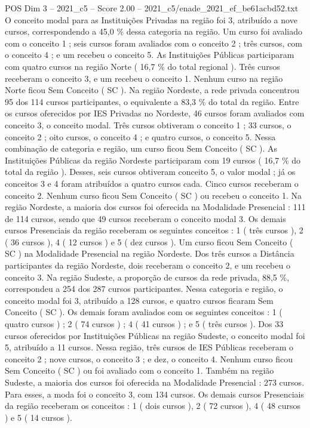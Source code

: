 \begin{textsample}{POS Dim 3 – 2021\_c5 – Score 2.00 – 2021\_c5/enade\_2021\_ef\_be61acbd52.txt}
O conceito modal para as Instituições Privadas na região foi 3, atribuído a nove cursos, correspondendo a 45,0 \% dessa categoria na região.
Um curso foi avaliado com o conceito 1 ; seis cursos foram avaliados com o conceito 2 ; três cursos, com o conceito 4 ; e um recebeu o conceito 5.
As Instituições Públicas participaram com quatro cursos na região Norte ( 16,7 \% do total regional ).
Três cursos receberam o conceito 3, e um recebeu o conceito 1.
Nenhum curso na região Norte ficou Sem Conceito ( SC ).
Na região Nordeste, a rede privada concentrou 95 dos 114 cursos participantes, o equivalente a 83,3 \% do total da região.
Entre os cursos oferecidos por IES Privadas no Nordeste, 46 cursos foram avaliados com conceito 3, o conceito modal.
Três cursos obtiveram o conceito 1 ; 33 cursos, o conceito 2 ; oito cursos, o conceito 4 ; e quatro cursos, o conceito 5.
Nessa combinação de categoria e região, um curso ficou Sem Conceito ( SC ).
As Instituições Públicas da região Nordeste participaram com 19 cursos ( 16,7 \% do total da região ).
Desses, seis cursos obtiveram conceito 5, o valor modal ; já os conceitos 3 e 4 foram atribuídos a quatro cursos cada.
Cinco cursos receberam o conceito 2.
Nenhum curso ficou Sem Conceito ( SC ) ou recebeu o conceito 1.
Na região Nordeste, a maioria dos cursos foi oferecida na Modalidade Presencial : 111 de 114 cursos, sendo que 49 cursos receberam o conceito modal 3.
Os demais cursos Presenciais da região receberam os seguintes conceitos : 1 ( três cursos ), 2 ( 36 cursos ), 4 ( 12 cursos ) e 5 ( dez cursos ).
Um curso ficou Sem Conceito ( SC ) na Modalidade Presencial na região Nordeste.
Dos três cursos a Distância participantes da região Nordeste, dois receberam o conceito 2, e um recebeu o conceito 3.
Na região Sudeste, a proporção de cursos da rede privada, 88,5 \%, correspondeu a 254 dos 287 cursos participantes.
Nessa categoria e região, o conceito modal foi 3, atribuído a 128 cursos, e quatro cursos ficaram Sem Conceito ( SC ).
Os demais foram avaliados com os seguintes conceitos : 1 ( quatro cursos ) ; 2 ( 74 cursos ) ; 4 ( 41 cursos ) ; e 5 ( três cursos ).
Dos 33 cursos oferecidos por Instituições Públicas na região Sudeste, o conceito modal foi 5, atribuído a 11 cursos.
Nessa região, três cursos de IES Públicas receberam o conceito 2 ; nove cursos, o conceito 3 ; e dez, o conceito 4.
Nenhum curso ficou Sem Conceito ( SC ) ou foi avaliado com o conceito 1.
Também na região Sudeste, a maioria dos cursos foi oferecida na Modalidade Presencial : 273 cursos.
Para esses, a moda foi o conceito 3, com 134 cursos.
Os demais cursos Presenciais da região receberam os conceitos : 1 ( dois cursos ), 2 ( 72 cursos ), 4 ( 48 cursos ) e 5 ( 14 cursos ).

\end{textsample}
